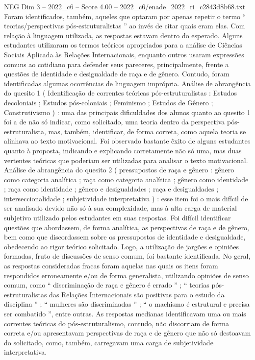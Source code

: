 \begin{textsample}{NEG Dim 3 – 2022\_c6 – Score 4.00 – 2022\_c6/enade\_2022\_ri\_c2843d8b68.txt}
Foram identificados, também, aqueles que optaram por apenas repetir o termo “ teorias/perspectivas pós-estruturalistas ” ao invés de citar quais eram elas.
Com relação à linguagem utilizada, as respostas estavam dentro do esperado.
Alguns estudantes utilizaram os termos teóricos apropriados para a análise de Ciências Sociais Aplicada às Relações Internacionais, enquanto outros usaram expressões comuns ao cotidiano para defender seus pareceres, principalmente, frente a questões de identidade e desigualdade de raça e de gênero.
Contudo, foram identificadas algumas ocorrências de linguagem imprópria.
Análise de abrangência do quesito 1 ( Identificação de correntes teóricas pós-estruturalistas : Estudos decoloniais ; Estudos pós-coloniais ; Feminismo ; Estudos de Gênero ; Construtivismo ) : uma das principais dificuldades dos alunos quanto ao quesito 1 foi a de não só indicar, como solicitado, uma teoria dentro da perspectiva pós-estruturalista, mas, também, identificar, de forma correta, como aquela teoria se alinhava ao texto motivacional.
Foi observado bastante êxito de alguns estudantes quanto à proposta, indicando e explicando corretamente não só uma, mas duas vertentes teóricas que poderiam ser utilizadas para analisar o texto motivacional.
Análise de abrangência do quesito 2 ( pressupostos de raça e gênero : gênero como categoria analítica ; raça como categoria analítica ; gênero como identidade ; raça como identidade ; gênero e desigualdades ; raça e desigualdades ; interseccionalidade ; subjetividade interpretativa ) : esse item foi o mais difícil de ser analisado devido não só à sua complexidade, mas à alta carga de material subjetivo utilizado pelos estudantes em suas respostas.
Foi difícil identificar questões que abordassem, de forma analítica, as perspectivas de raça e de gênero, bem como que discordassem sobre os pressupostos de identidade e desigualdade, obedecendo ao rigor teórico solicitado.
Logo, a utilização de jargões e opiniões formadas, fruto de discussões de senso comum, foi bastante identificada.
No geral, as respostas consideradas fracas foram aquelas nas quais os itens foram respondidos erroneamente e/ou de forma generalista, utilizando opiniões de senso comum, como “ discriminação de raça e gênero é errado ” ; “ teorias pós-estruturalistas das Relações Internacionais são positivas para o estudo da disciplina ” ; “ mulheres são discriminadas ” ; “ o machismo é estrutural e precisa ser combatido ”, entre outras.
As respostas medianas identificavam uma ou mais correntes teóricas do pós-estruturalismo, contudo, não discorriam de forma correta e/ou apresentavam perspectivas de raça e de gênero que não só destoavam do solicitado, como, também, carregavam uma carga de subjetividade interpretativa.

\end{textsample}
